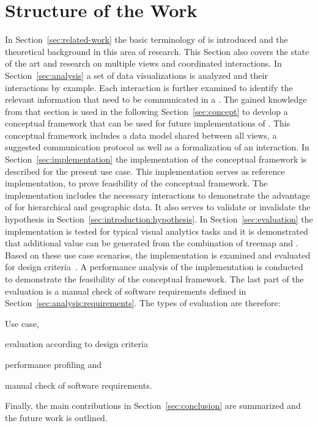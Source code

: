 \section{Structure of the Work}

In Section~\ref{sec:related-work} the basic terminology of \cmvs{} is introduced and the theoretical background in this area of research.
This Section also covers the state of the art and research on multiple views and coordinated interactions.
In Section~\ref{sec:analysis} a set of data visualizations is analyzed and their interactions by example.
Each interaction is further examined to identify the relevant information that need to be communicated in a \cmv{}.
The gained knowledge from that section is used in the following Section~\ref{sec:concept} to develop a conceptual framework that can be used for future implementations of \cmvs{}.
This conceptual framework includes a data model shared between all views, a suggested communication protocol as well as a formalization of an interaction.
In Section~\ref{sec:implementation} the implementation of the conceptual framework is described for the present use case.
This implementation serves as reference implementation, to prove feasibility of the conceptual framework.
The implementation includes the necessary interactions to demonstrate the advantage of \cmvs{} for hierarchical and geographic data.
It also serves to validate or invalidate the hypothesis in Section~\ref{sec:introduction:hypothesis}.
In Section~\ref{sec:evaluation} the implementation is tested for typical visual analytics tasks and it is demonstrated that additional value can be generated from the combination of treemap and \gv{}.
Based on these use case scenarios, the \cmv{} implementation is examined and evaluated for design criteria~\parencite{Baldonado2000}.
A performance analysis of the implementation is conducted to demonstrate the feasibility of the conceptual framework.
The last part of the evaluation is a manual check of software requirements defined in Section~\ref{sec:analysis:requirements}.
The types of evaluation are therefore:

\begin{enumerate*}[label=(\arabic*)]
  \item Use case,
  \item evaluation according to design criteria
  \item performance profiling and
  \item manual check of software requirements.
\end{enumerate*}

Finally, the main contributions in Section~\ref{sec:conclusion} are summarized and the future work is outlined.

